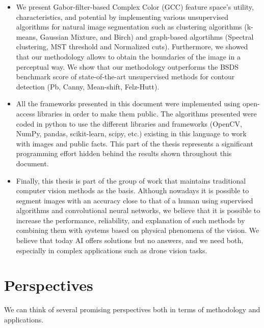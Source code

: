 \begin{itemize}
	\item We present Gabor-filter-based Complex Color (GCC) feature space's utility, characteristics, and potential by implementing various unsupervised algorithms for natural image segmentation such as clustering algorithms (k-means, Gaussian Mixture, and Birch) and graph-based algortihms (Spectral clustering, MST threshold and Normalized cuts). Furthermore, we showed that our methodology allows to obtain the boundaries of the image in a perceptual way. We show that our methodology outperforms the BSDS benchmark score of state-of-the-art unsupervised methods for contour detection (Pb, Canny, Mean-shift, Felz-Hutt).
	
	\item All the frameworks presented in this document were implemented using open-access libraries in order to make them public. The algorithms presented were coded in python to use the different libraries and frameworks (OpenCV, NumPy, pandas, scikit-learn, scipy, etc.) existing in this language to work with images and public facts. This part of the thesis represents a significant programming effort hidden behind the results shown throughout this document.
	
	\item Finally, this thesis is part of the group of work that maintains traditional computer vision methods as the basis. Although nowadays it is possible to segment images with an accuracy close to that of a human using supervised algorithms and convolutional neural networks, we believe that it is possible to increase the performance, reliability, and explanation of such methods by combining them with systems based on physical phenomena of the vision. We believe that today AI offers solutions but no answers, and we need both, especially in complex applications such as drone vision tasks.	
	
\end{itemize}


\section*{Perspectives}

We can think of several promising perspectives both in terms of methodology and applications.

